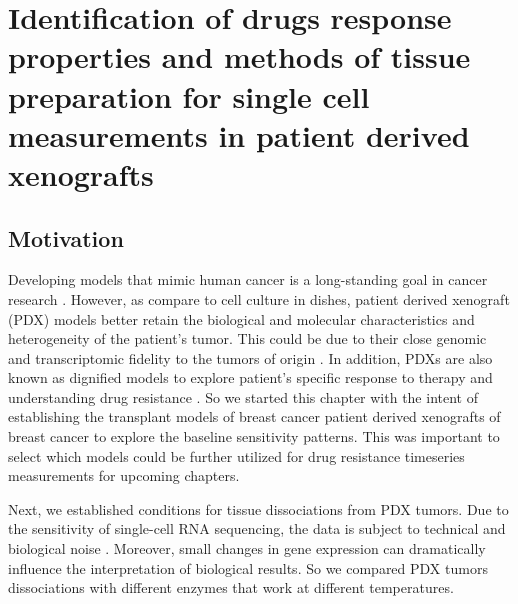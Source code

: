 \chapter{Identification of drugs response properties and methods of tissue preparation for single cell measurements in patient derived xenografts %
}
\label{ch:Chapter 3}

\section{Motivation}
Developing models that mimic human cancer is a long-standing goal in cancer research \cite{aparicio2015examining, may2018cancer, ryu2019integrative}. However, as compare to cell culture in dishes, patient derived xenograft (PDX) models better retain the biological and molecular characteristics and heterogeneity of the patient's tumor. This could be due to their close genomic and transcriptomic fidelity to the tumors of origin \cite{lin2014high}. In addition, PDXs are also known as dignified models to explore patient's specific response to therapy and understanding drug resistance \cite{matossian2019drug, derose2011tumor}. So we started this chapter with the intent of establishing the transplant models of breast cancer patient derived xenografts of breast cancer to explore the baseline sensitivity patterns. This was important to select which models could be further utilized for drug resistance timeseries measurements for upcoming chapters. 

Next, we established conditions for tissue dissociations from PDX tumors. 
Due to the sensitivity of single-cell RNA sequencing, the data is subject to technical and biological noise \cite{potter2018single, stegle2015computational}. Moreover, small changes in gene expression can dramatically influence the interpretation of biological results. So we compared PDX tumors dissociations with different enzymes that work at different temperatures.


